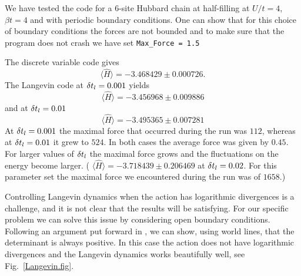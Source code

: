 We have tested the code for a 6-site Hubbard chain at half-filling  at $U/t = 4$,  $\beta t = 4$    and with periodic boundary conditions.   One can show that for this choice of boundary conditions the   forces are not bounded 
and to make sure that the program does not   crash we have  set \texttt{Max\_Force = 1.5}  


 The discrete  variable code gives
\begin{equation}
 \langle  \hat{H} \rangle  =  -3.468429   \pm     0.000726.
\end{equation} 
The Langevin code at $ \delta t_{l} = 0.001$  yields 
\begin{equation}
 \langle  \hat{H} \rangle  =  -3.456968   \pm   0.009886 
\end{equation} 
and at $ \delta t_{l} = 0.01$ 
\begin{equation}
 \langle  \hat{H} \rangle  = -3.495365    \pm  0.007281 
\end{equation} 
 At $ \delta t_{l} = 0.001$   the maximal force that occurred during the run was 
$ 112$, whereas at $ \delta t_{l} = 0.01$ it grew to $524$.    In both cases the average force was given by $0.45$.   For larger values of  $ \delta t_{l} $ the maximal force grows and the fluctuations on the energy become  larger.  
( $ \langle  \hat{H} \rangle  =  -3.718439    \pm   0.206469 $  at $ \delta t_{l} = 0.02$. For this parameter set  the maximal force we encountered during the run was of $1658$.)

Controlling Langevin dynamics when the action has logarithmic divergences is a challenge, and it is not clear  that the results will be satisfying.  For our specific problem we can solve this issue by considering open boundary conditions. Following an argument put forward in \cite{Assaad07}, we can show, using world lines, that the determinant is always positive.   In this case the  action does not  have logarithmic divergences and the Langevin dynamics works beautifully well, see Fig.~\ref{Langevin.fig}. 


